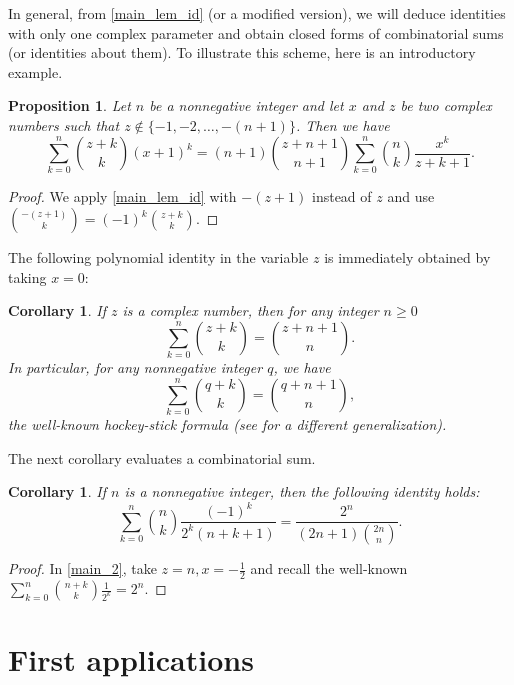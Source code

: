 \documentclass[10pt,a4paper]{amsart}
\numberwithin{equation}{section}
\newtheorem{proposition}[thm]{Proposition}
\newtheorem{corollary}[thm]{Corollary}
\begin{document}
In general, from \eqref{main_lem_id} (or a modified version), we will deduce identities with only one complex parameter and obtain closed forms of combinatorial sums (or identities about them). To illustrate this scheme, here is an introductory example.

\begin{proposition}
Let $n$ be a nonnegative integer and let $x$ and $z$ be two complex numbers such that 
$z\notin\{-1,-2,\ldots,-(n+1)\}$. Then we have
\begin{equation}\label{main_2}
\sum_{k=0}^n \binom{z+k}{k} (x+1)^k = (n+1)\binom{z+n+1}{n+1} \sum_{k=0}^n \binom{n}{k} \frac{x^k}{z+k+1}.
\end{equation}
\end{proposition}
\begin{proof}
We apply \eqref{main_lem_id} with $-(z+1)$ instead of $z$ and use $\binom{-(z+1)}{k}=(-1)^k\binom{z+k}{k}$.
\end{proof}

The following polynomial identity in the variable $z$ is immediately obtained by taking $x=0$:

\begin{corollary}\label{main_2_cor_1 }
If $z$ is a complex number, then for any integer $n\ge 0$
\begin{equation}
\sum_{k=0}^n \binom{z+k}{k} = \binom{z+n+1}{n}.
\end{equation}
In particular, for any nonnegative integer $q$, we have
\begin{equation*}
\sum_{k=0}^n \binom{q+k}{k} = \binom{q+n+1}{n},
\end{equation*}
the well-known hockey-stick formula (see \cite{Lynch} for a different generalization).
\end{corollary}

The next corollary evaluates a combinatorial sum.

\begin{corollary} 
If $n$ is a nonnegative integer, then the following identity holds:
\[\sum_{k=0}^n \binom{n}{k} \frac{(-1)^k}{2^k(n+k+1)} = \frac{2^n}{(2n+1)\binom{2n}{n}}.\]
\end{corollary}
\begin{proof}
In \eqref{main_2}, take $z=n,x=-\frac{1}{2}$ and recall the well-known $\sum_{k=0}^n \binom{n+k}{k}\frac{1}{2^k}=2^n$.
\end{proof}

\section{First applications}
\end{document}
